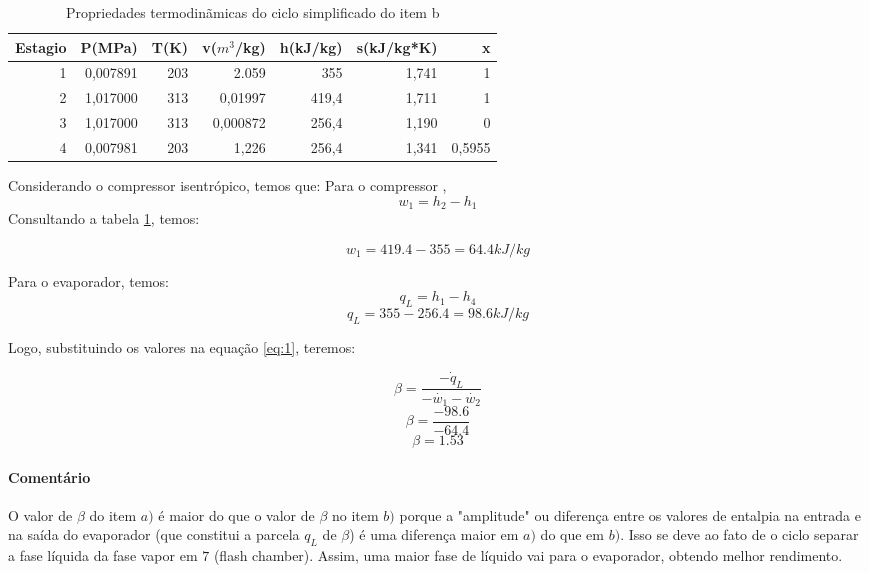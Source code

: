 \begin{table}[htbp]
  \centering
  \caption{Propriedades termodinãmicas do ciclo simplificado do item b}
    \begin{tabular}{rrrrrrr}
    \toprule
    Estagio & P(MPa) & T(K)  & v($m^{3}$/kg) & h(kJ/kg) & s(kJ/kg*K) & x \\
    \midrule
    1     & 0,007891 & 203   & 2.059 & 355   & 1,741 & 1 \\
    2     & 1,017000 & 313   & 0,01997 & 419,4 & 1,711 & 1 \\
    3     & 1,017000 & 313   & 0,000872 & 256,4 & 1,190 & 0 \\
    4     & 0,007981 & 203   & 1,226 & 256,4 & 1,341 & 0,5955 \\
    \bottomrule
    \end{tabular}%
  \label{tab:2}%
\end{table}%

Considerando o compressor isentrópico, temos que:
Para o compressor ,
\[w_{1} = h_{2} - h_{1}\]
Consultando a tabela \ref{tab:2}, temos:

\[w_{1} = 419.4 - 355 = 64.4 kJ/kg\]

Para o evaporador, temos:
\[q_{L} = h_{1} - h_{4}\]
\[q_{L} = 355 - 256.4 = 98.6 kJ/kg\]

Logo, substituindo os valores na equação \ref{eq:1}, teremos:

\[\beta = \frac{ -\dot{q}_{L}  }{ -\dot{w_{1}} - \dot{w_{2}} }\]
\[\beta = \frac{ -98.6  }{ -64.4 } \]
\[\beta = 1.53\]

\paragraph*{Comentário}
O valor de $\beta$ do item $a)$ é maior do que o valor de $\beta$ no item $b)$ porque a "amplitude" ou diferença entre os valores de entalpia na entrada e na saída do evaporador (que constitui a parcela $q_{L}$ de $\beta$) é uma diferença maior em $a)$ do que em $b)$. Isso se deve ao fato de o ciclo separar a fase líquida da fase vapor em $7$ (flash chamber). Assim, uma maior fase de líquido vai para o evaporador, obtendo melhor rendimento.